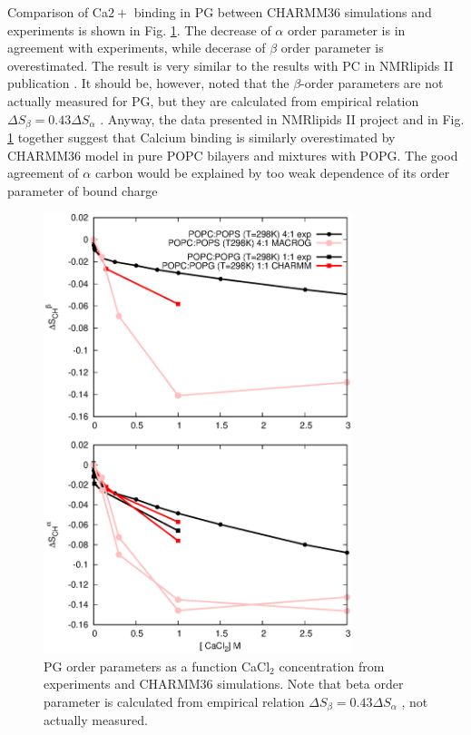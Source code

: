\documentclass[aps,prl,superscriptaddress,twocolumn]{revtex4}
\begin{document}
Comparison of Ca$2+$ binding in PG between CHARMM36 simulations and experiments \cite{borle85}
is shown in Fig. \ref{changesWITHCaClPG}. The decrease of $\alpha$ order parameter
is in agreement with experiments, while decerase of $\beta$ order parameter is overestimated.
The result is very similar to the results with PC in NMRlipids II publication \cite{catte16}.
It should be, however, noted that the $\beta$-order parameters are not actually measured for PG,
but they are calculated from empirical relation $\Delta S_{\beta}=0.43\Delta S_{\alpha}$ \cite{akutsu81}.
Anyway, the data presented in NMRlipids II project and in Fig. \ref{changesWITHCaClPG} together
suggest that Calcium binding is similarly overestimated by CHARMM36 model in pure POPC bilayers and mixtures with
POPG. The good agreement of $\alpha$ carbon would be explained by too weak dependence of its order
parameter of bound charge
\begin{figure}[]
  \centering
  \includegraphics[width=9.0cm]{../Figs/CHANGESwithCaClPGPS.eps}
  \caption{\label{changesWITHCaClPG}
    PG order parameters as a function CaCl$_2$ concentration from experiments \cite{borle85} and CHARMM36 simulations.
    Note that beta order parameter is calculated from empirical relation $\Delta S_{\beta}=0.43\Delta S_{\alpha}$ \cite{akutsu81}, not actually measured. 
  }
\end{figure}
\end{document}
